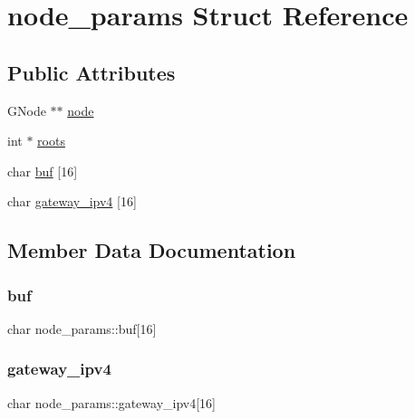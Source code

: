 \hypertarget{structnode__params}{}\section{node\+\_\+params Struct Reference}
\label{structnode__params}
\subsection*{Public Attributes}
\begin{DoxyCompactItemize}
\item 
G\+Node $\ast$$\ast$ \hyperlink{structnode__params_a86b07f6f7d575e6b84723fbe1540771f}{node}
\item 
int $\ast$ \hyperlink{structnode__params_a5a78aaca912a055ee5920a7b222b0fd1}{roots}
\item 
char \hyperlink{structnode__params_a21fbc3409f16b2cbf0e00b76c041081f}{buf} \mbox{[}16\mbox{]}
\item 
char \hyperlink{structnode__params_ad543877faaca7b728c222501f57fb5a3}{gateway\+\_\+ipv4} \mbox{[}16\mbox{]}
\end{DoxyCompactItemize}


\subsection{Member Data Documentation}
\mbox{\label{structnode__params_a21fbc3409f16b2cbf0e00b76c041081f}} 
\subsubsection{\texorpdfstring{buf}{buf}}
{\footnotesize\ttfamily char node\+\_\+params\+::buf\mbox{[}16\mbox{]}}

\mbox{\label{structnode__params_ad543877faaca7b728c222501f57fb5a3}} 
\subsubsection{\texorpdfstring{gateway\+\_\+ipv4}{gateway\_ipv4}}
{\footnotesize\ttfamily char node\+\_\+params\+::gateway\+\_\+ipv4\mbox{[}16\mbox{]}}


